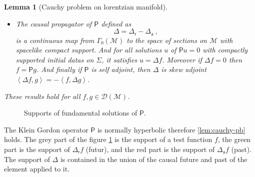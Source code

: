 \documentclass[10pt]{book}
\newcommand{\sm}[1]{\left\langle#1\right\rangle}
\newcommand{\Dcal}{\mathcal{D}}
\newcommand{\Mcal}{\mathcal{M}}
\newcommand{\Psf}{\mathsf{P}}
\newcommand{\asf}{\mathsf{a}}
\newcommand{\rsf}{\mathsf{r}}
\theoremstyle{break}
\newtheorem{lemma}{Lemma}
\begin{document}
\begin{lemma}[Cauchy problem on lorentzian manifold]
\begin{itemize}
\item The causal propagator of $\Psf$ defined as
%
\begin{equation}
\Delta = \Delta_\rsf - \Delta_\asf \ ,
\end{equation}
%
is a continuous map from $\Gamma_0(\Mcal)$ to the space of sections on $\Mcal$ with spacelike compact support. And for all solutions $u$ of $\Psf u =0$ with compactly supported initial datas on $\Sigma$, it satisfies $u = \Delta f$. Moreover if $\Delta f =0$ then $f = \Psf g$. And finally if $\Psf$ is self adjoint, then $\Delta$ is skew adjoint $\sm{\Delta f,g} = - \sm{f,\Delta g}$.

\end{itemize}
%
These results hold for all $f, g \in \Dcal(\Mcal)$.
\end{lemma}


\begin{figure}[h]
\centering
{} 
\caption{Supports of fundamental solutions of $\Psf$.}
\label{fig:Supp-sol-fonda}
\end{figure}



The Klein Gordon operator $\Psf$ is normally hyperbolic therefore \ref{lem:cauchy-pb} holds. The grey part of the figure \ref{fig:Supp-sol-fonda} is the support of a test function $f$,  the green part is the support of $\Delta_{\mathsf{r}} f$ (futur), and the red part is the support of $\Delta_{\mathsf{a}} f$ (past). The support of $\Delta$ is contained in the union of the causal future and past of the element applied to it.


\bigskip
\end{document}
